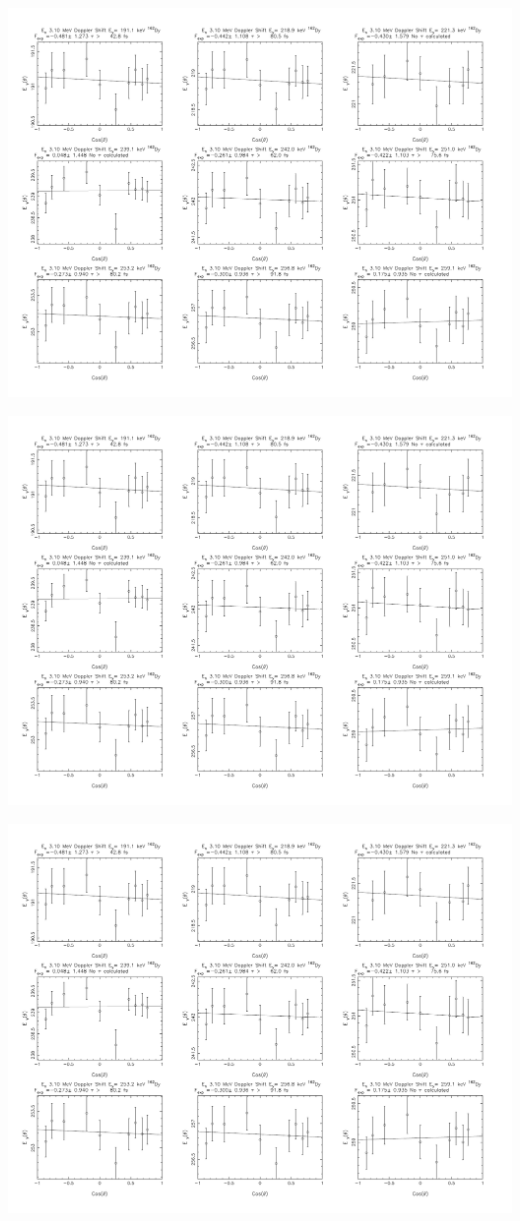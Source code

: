 \begin{center}
\includegraphics[page=27,angle=90,height=0.95\textheight]{162Dy_ftau_310_HE_n.pdf}
\end{center}
\begin{center}
\includegraphics[page=28,angle=90,height=0.95\textheight]{162Dy_ftau_310_HE_n.pdf}
\end{center}
\begin{center}
\includegraphics[page=29,angle=90,height=0.95\textheight]{162Dy_ftau_310_HE_n.pdf}
\end{center}
